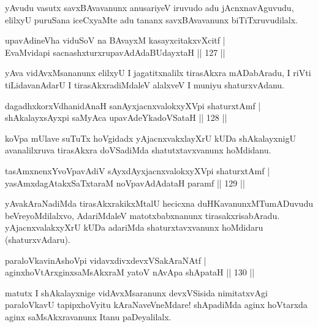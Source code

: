 \begin{artha}
yAvudu vasutx savxBAvavanunx anusariyeV iruvudo adu jAcnxnavAguvudu, elilxyU puruSana iceCxyaMte adu tananx savxBAvavanunx biTiTxruvudilalx.
\end{artha}

\begin{shl}
\footnotemark[2]{}upavAdineVha viduSoV na BAvayxM kasayxcitakxvXcitf |\\
EvaMvidapi sacnashxturxrupavAdAdaBUdayxtaH \hfill || 127 ||
\end{shl}

\begin{artha}
yAva vidAvxMsananunx elilxyU I jagatitxnalilx tirasAkxra mADabAradu, I riVti tiLidavanAdarU I tirasAkxradiMdaleV alalxveV I muniyu shaturxvAdanu.
\end{artha}

\begin{shl}
dagadhxkorxVdhanidAnaH sanAyxjacnxvalokxyXV\s pi shaturxtAmf |\\
shAkalayxsAyxpi saMyAca upavAdeYkadoVSataH \hfill || 128 ||
\end{shl}

\begin{artha}
koVpa mUlave suTuTx hoVgidadx yAjacnxvakxlayXrU kUDa shAkalayxnigU avanalilxruva tirasAkxra doVSadiMda shatutxtavxvanunx hoMdidanu.
\end{artha}%

\begin{shl}
tasAmxnenxYvoVpavAdiV sAyxdAyxjacnxvalokxyXV\s pi shaturxtAmf |\\
yasAmxdagAtakxSaTxtaraM noVpavAdAdataH paramf \hfill || 129 ||
\end{shl}

\begin{artha}
yAvakAraNadiMda tirasAkxrakikxMtalU hecicxna duHKavanunxMTumADuvudu beVreyoMdilalxvo, AdariMdaleV matotxbabxnanunx tirasakxrisabAradu. yAjacnxvalakxyXrU kUDa adariMda shaturxtavxvanunx hoMdidaru (shaturxvAdaru).
\end{artha}

\begin{shl}
paraloVkavinAshoV\s pi vidavxdivxdevxVSakAraNAtf |\\
aginxhoVtArxginxsaMsAkxraM yatoV nAvApa shApataH \hfill || 130 ||
\end{shl}

\begin{artha}
matutx I shAkalayxnige vidAvxMsaranunx devxVSisida nimitatxvAgi paraloVkavU tapipxhoVyitu kAraNaveVneMdare! shApadiMda aginx hoVtarxda aginx saMsAkxravanunx Itanu paDeyalilalx.
\end{artha}

